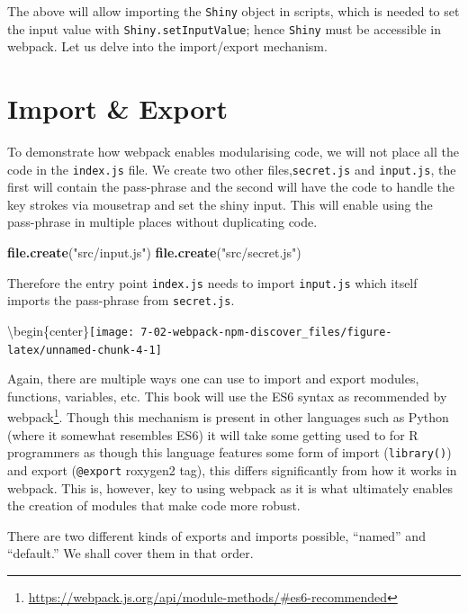 \documentclass[
]{krantz}
\makeatletter
\newenvironment{Shaded}{\begin{snugshade}}{\end{snugshade}}
\newcommand{\KeywordTok}[1]{\textcolor[rgb]{0.27,0.27,0.27}{\textbf{#1}}}
\newcommand{\NormalTok}[1]{#1}
\newcommand{\StringTok}[1]{\textcolor[rgb]{0.5,0.5,0.5}{#1}}
\renewcommand{\href}[2]{#2\footnote{\url{#1}}}
\newenvironment{kframe}{%
\medskip{}
\setlength{\fboxsep}{.8em}
 \def\at@end@of@kframe{}%
 \ifinner\ifhmode%
  \def\at@end@of@kframe{\end{minipage}}%
  \begin{minipage}{\columnwidth}%
 \fi\fi%
 \def\FrameCommand##1{\hskip\@totalleftmargin \hskip-\fboxsep
 \colorbox{shadecolor}{##1}\hskip-\fboxsep
     \hskip-\linewidth \hskip-\@totalleftmargin \hskip\columnwidth}%
 \MakeFramed {\advance\hsize-\width
   \@totalleftmargin\z@ \linewidth\hsize
   \@setminipage}}%
 {\par\unskip\endMakeFramed%
 \at@end@of@kframe}
\renewenvironment{Shaded}{\begin{kframe}}{\end{kframe}}
\makeatother
\begin{document}
The above will allow importing the \texttt{Shiny} object in scripts, which is needed to set the input value with \texttt{Shiny.setInputValue}; hence \texttt{Shiny} must be accessible in webpack. Let us delve into the import/export mechanism.

\hypertarget{webpack-intro-import-export}{%
\section{Import \& Export}\label{webpack-intro-import-export}}

To demonstrate how webpack enables modularising code, we will not place all the code in the \texttt{index.js} file. We create two other files,\texttt{secret.js} and \texttt{input.js}, the first will contain the pass-phrase and the second will have the code to handle the key strokes via mousetrap and set the shiny input. This will enable using the pass-phrase in multiple places without duplicating code.

\begin{Shaded}
\begin{Highlighting}[]
\KeywordTok{file.create}\NormalTok{(}\StringTok{"src/input.js"}\NormalTok{)}
\KeywordTok{file.create}\NormalTok{(}\StringTok{"src/secret.js"}\NormalTok{)}
\end{Highlighting}
\end{Shaded}

Therefore the entry point \texttt{index.js} needs to import \texttt{input.js} which itself imports the pass-phrase from \texttt{secret.js}.

\textbackslash begin\{center\}\texttt{[image: 7-02-webpack-npm-discover\_files/figure-latex/unnamed-chunk-4-1]}

Again, there are multiple ways one can use to import and export modules, functions, variables, etc. This book will use the ES6 syntax as \href{https://webpack.js.org/api/module-methods/\#es6-recommended}{recommended by webpack}. Though this mechanism is present in other languages such as Python (where it somewhat resembles ES6) it will take some getting used to for R programmers as though this language features some form of import (\texttt{library()}) and export (\texttt{@export} roxygen2 tag), this differs significantly from how it works in webpack. This is, however, key to using webpack as it is what ultimately enables the creation of modules that make code more robust.

There are two different kinds of exports and imports possible, ``named'' and ``default.'' We shall cover them in that order.
\end{document}
